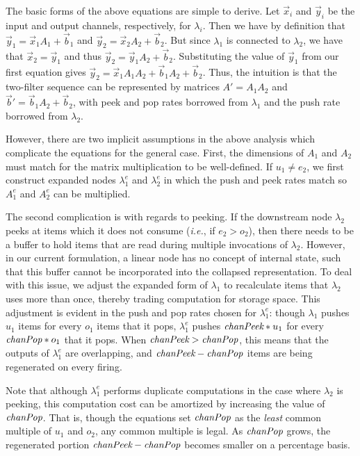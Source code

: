 \documentclass{sig-alternate}
\begin{document}
{The basic forms of the above equations are simple to derive.  Let
${\vec x}_i$ and ${\vec y}_i$ be the input and output channels, respectively, for
$\lambda_i$.  Then we have by definition that ${\vec y}_1 = {\vec x}_1 A_1 + {\vec b}_1$
and ${\vec y}_2 = {\vec x}_2 A_2 + {\vec b}_2$.  But since $\lambda_1$ is connected to
$\lambda_2$, we have that ${\vec x}_2 = {\vec y}_1$ and thus 
${\vec y}_2 = {\vec y}_1 A_2 + {\vec b}_2$.
Substituting the value of ${\vec y}_1$ from our first equation gives ${\vec y}_2 =
{\vec x}_1 A_1 A_2 + {\vec b}_1 A_2 + {\vec b}_2$.  Thus, the intuition is that the
two-filter sequence can be represented by matrices $A' = A_1 A_2$
and ${\vec b}' = {\vec b}_1 A_2 + {\vec b}_2$, with peek and pop rates borrowed from
$\lambda_1$ and the push rate borrowed from $\lambda_2$.

However, there are two implicit assumptions in the above analysis
which complicate the equations for the general case.  First, the
dimensions of $A_1$ and $A_2$ must match for the matrix multiplication
to be well-defined.  If $u_1 \ne e_2$, we first construct
expanded nodes $\lambda_1^e$ and $\lambda_2^e$ in which the push and
peek rates match so $A_1^e$ and $A_2^e$ can be multiplied.

The second complication is with regards to peeking.  If the downstream
node $\lambda_2$ peeks at items which it does not consume ({\it i.e.},
if $e_2 > o_2$), then there needs to be a buffer to hold items that
are read during multiple invocations of $\lambda_2$.  However, in our
current formulation, a linear node has no concept of internal state,
such that this buffer cannot be incorporated into the collapsed
representation.  To deal with this issue, we adjust the expanded form
of $\lambda_1$ to recalculate items that $\lambda_2$ uses more than
once, thereby trading computation for storage space.  This adjustment
is evident in the push and pop rates chosen for $\lambda_1^e$: though
$\lambda_1$ pushes $u_1$ items for every $o_1$ items that it pops,
$\lambda_1^e$ pushes $\mbox{\it chanPeek}*u_1$ for every $\mbox{\it chanPop}*o_1$
that it pops.  When $\mbox{\it chanPeek}>\mbox{\it chanPop}$, this means that the
outputs of $\lambda_1^e$ are overlapping, and
$\mbox{\it chanPeek}-\mbox{\it chanPop}$ items are being regenerated on every
firing.

Note that although $\lambda_1^e$ performs duplicate computations in
the case where $\lambda_2$ is peeking, this computation cost can be
amortized by increasing the value of $\mbox{\it chanPop}$.  That is, though
the equations set $\mbox{\it chanPop}$ as the {\it least} common multiple of
$u_1$ and $o_2$, any common multiple is legal.  As $\mbox{\it chanPop}$
grows, the regenerated portion $\mbox{\it chanPeek}-\mbox{\it chanPop}$ becomes
smaller on a percentage basis.

}
\end{document}
